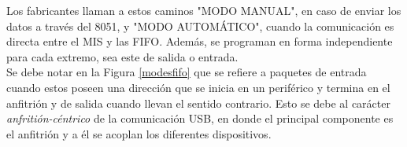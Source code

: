 	Los fabricantes llaman a estos caminos "MODO MANUAL", en caso de enviar los datos a través del 8051, y "MODO AUTOMÁTICO", cuando la comunicación es directa entre el MIS y las FIFO. Además, se programan en forma independiente para cada extremo, sea este de salida o entrada.\\
	
	Se debe notar en la Figura \ref{modesfifo} que se refiere a paquetes de entrada cuando estos poseen una dirección que se inicia en un periférico y termina en el anfitrión y de salida cuando llevan el sentido contrario. Esto se debe al carácter {\it anfritión-céntrico} de la comunicación USB, en donde el principal componente es el anfitrión y a él se acoplan los diferentes dispositivos.\\
	
	